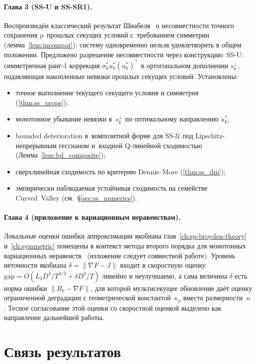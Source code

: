 \paragraph{Глава 3 (SS-U и SS-SR1).}
Воспроизведён классический результат Шнабеля~\cite{schnabel1983}
о несовместности точного сохранения $p$~прошлых секущих условий
с~требованием симметрии (лемма~\ref{lem:incompat}): систему
одновременно нельзя удовлетворить в общем положении.
Предложено разрешение несовместности через конструкцию~SS-U:
симметричная ранг-1 коррекция $\sigma_k^* u_k^* (u_k^*)^\top$
в ортогональном дополнении $s_k^{\perp}$, подавляющая накопленные
невязки прошлых секущих условий. Установлены:
\begin{itemize}[leftmargin=*]
  \item точное выполнение текущего секущего условия и симметрия
        (\ref{thm:ss_props});
  \item монотонное убывание невязки в~$s_k^{\perp}$ по оптимальному
        направлению $u_k^*$;
  \item bounded deterioration в~композитной форме для $\mathrm{SS}\text{-}\mathcal{U}$
        под Lipschitz-непрерывным гессианом и~входной Q-линейной
        сходимостью (Лемма~\ref{lem:bd_composite});
  \item сверхлинейная сходимость по критерию Dennis--More
        (\ref{thm:ss_dm});
  \item эмпирически наблюдаемая устойчивая сходимость на семействе
        Curved~Valley (см.~\S\ref{sec:ss_numerics}).
\end{itemize}

\paragraph{Глава 4 (приложение к вариационным неравенствам).}
Локальные оценки ошибки аппроксимации якобиана
глав~\ref{ch:sp-broyden-theory} и~\ref{ch:symmetric} помещены в
контекст метода второго порядка для монотонных вариационных
неравенств~\cite{viqa2024} (изложение следует совместной работе).
Уровень неточности якобиана $\delta=\|\nabla F-J\|$ входит в скоростную
оценку $\mathrm{gap}=O(L_1 D^3/T^{3/2}+\delta D^2/T)$ линейно и
неулучшаемо, а сама величина $\delta$ есть норма ошибки
$\|B_k-\nabla F\|$, для которой мультисекущее обновление даёт оценку
ограниченной деградации с геометрической константой~$\kappa_p$ вместо
размерности~$n$. Тесное согласование этой оценки со скоростной оценкой
выделено как направление дальнейшей работы.

\section*{Связь результатов}

